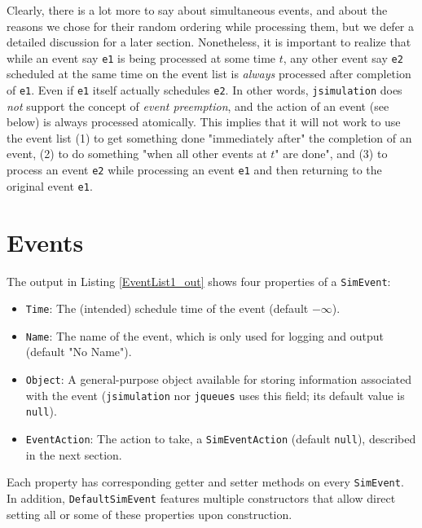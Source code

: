 Clearly, there is a lot more to say about simultaneous events,
  and about the reasons we chose for their random ordering
  while processing them, but we defer a detailed discussion for a later section.
Nonetheless, it is important to realize
  that while an event say \lstinline|e1|
  is being processed at some time $t$,
  any other event say \lstinline|e2|
  scheduled at the same time on the event list
  is {\em always\/} processed after completion of \lstinline|e1|.
Even if \lstinline|e1| itself actually schedules \lstinline|e2|. 
In other words,
  \lstinline|jsimulation| does {\em not\/} support the concept
  of {\em event preemption\/},
  and the action of an event (see below)
  is always processed atomically.
This implies that it will not work
  to use the event list
  (1) to get something done "immediately after" the completion of an event,
  (2) to do something "when all other events at $t$" are done",
  and
  (3) to process an event \lstinline|e2|
     while processing an event \lstinline|e1|
     and then returning to the original event \lstinline|e1|.

\section{Events}

The output in Listing \ref{EventList1_out}
  shows four properties of a \lstinline|SimEvent|:
\begin{itemize}
\item \lstinline|Time|:
        The (intended) schedule time of the event (default $-\infty$).
\item \lstinline|Name|:
        The name of the event,
        which is only used for logging and output (default "No Name").
\item \lstinline|Object|:
        A general-purpose object available for storing information
        associated with the event
        (\lstinline{jsimulation} nor \lstinline{jqueues}
        uses this field;
        its default value is \lstinline{null}).
\item \lstinline|EventAction|:
        The action to take, a \lstinline{SimEventAction}
        (default \lstinline{null}),
        described in the next section.
\end{itemize}
Each property has corresponding getter and setter methods
  on every \lstinline|SimEvent|.
In addition,
  \lstinline|DefaultSimEvent| features
  multiple constructors that allow
  direct setting all or some of these properties upon construction.

